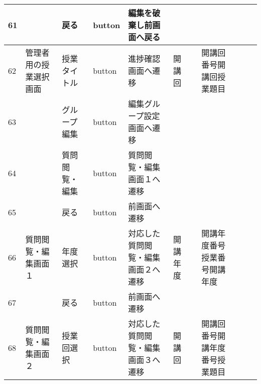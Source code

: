 \begin{table}[]
\begin{tabular}{|l|l|l|l|l|l|l|l|l|l|l|}
61  &               & 戻る               & button   & 編集を破棄し前画面へ戻る                                                      &         &                       &                    &                 &                               &                                                                \\ \hline
62  & 管理者用の授業選択画面   & 授業タイトル           & button   & 進捗確認画面へ遷移                                                         & 開講回     &                       & 開講回番号開講回授業題目       &                 &                               &                                                                \\ \hline
63  &               & グループ編集           & button   & 編集グループ設定画面へ遷移                                                     &         &                       &                    &                 &                               &                                                                \\ \hline
64  &               & 質問閲覧・編集          & button   & 質問閲覧・編集画面１へ遷移                                                     &         &                       &                    &                 &                               &                                                                \\ \hline
65  &               & 戻る               & button   & 前画面へ遷移                                                            &         &                       &                    &                 &                               &                                                                \\ \hline
66  & 質問閲覧・編集画面１    & 年度選択             & button   & 対応した質問閲覧・編集画面２へ遷移                                                 & 開講年度    &                       & 開講年度番号授業番号開講年度     &                 &                               &                                                                \\ \hline
67  &               & 戻る               & button   & 前画面へ遷移                                                            &         &                       &                    &                 &                               &                                                                \\ \hline
68  & 質問閲覧・編集画面２    & 授業回選択            & button   & 対応した質問閲覧・編集画面３へ遷移                                                 & 開講回     &                       & 開講回番号開講年度番号授業題目    &                 &                               &                                                                \\ \hline

\end{tabular}
\end{table}
